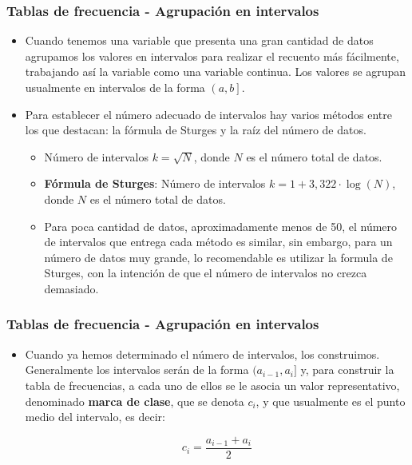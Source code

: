 \documentclass[10pt]{beamer}
\theoremstyle{plain} %
\theoremstyle{definition}
\theoremstyle{remark}
\begin{document}
\begin{frame}
\frametitle{Tablas de frecuencia - Agrupación en intervalos}
\begin{itemize}[<+->]
\justifying
\item Cuando tenemos una variable que presenta una gran cantidad de datos agrupamos los valores en intervalos para realizar el recuento más fácilmente, trabajando así la variable como una variable continua. Los valores se agrupan usualmente en intervalos de la forma $\left(a, b\right]$.

\item Para establecer el número adecuado de intervalos hay varios métodos entre los que destacan: la fórmula de Sturges y la raíz del número de datos.
\begin{itemize}[<+->]
\item Número de intervalos $k=\sqrt{N}$, donde $N$ es el número total de datos.
\item \textbf{Fórmula de Sturges}: Número de intervalos $k=1+3{,}322\cdot \log (N)$, donde $N$ es el número total de datos.

\item Para poca cantidad de datos, aproximadamente menos de 50, el número de intervalos que entrega cada método es similar, sin embargo, para un número de datos muy grande, lo recomendable es utilizar la formula de Sturges, con la intención de que el número de intervalos no crezca demasiado.
\end{itemize}
\end{itemize}
\end{frame}

\begin{frame}
\frametitle{Tablas de frecuencia - Agrupación en intervalos}
\begin{itemize}
\justifying
\item Cuando ya hemos determinado el número de intervalos, los construimos. Generalmente los intervalos serán de la forma $(a_{i-1}, a_i]$ y, para construir la tabla de frecuencias, a cada uno de ellos se le asocia un valor representativo, denominado \textbf{marca de clase}, que se denota $c_i$, y que usualmente es el punto medio del intervalo, es decir:

$$c_i=\frac{a_{i-1}+a_i}{2}$$
\end{itemize}
\end{frame}
\end{document}
